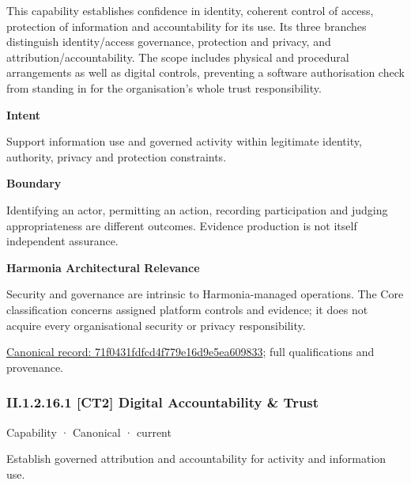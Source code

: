 This capability establishes confidence in identity, coherent control of access, protection of information and accountability for its use. Its three branches distinguish identity/access governance, protection and privacy, and attribution/accountability. The scope includes physical and procedural arrangements as well as digital controls, preventing a software authorisation check from standing in for the organisation's whole trust responsibility.



\textbf{Intent}



Support information use and governed activity within legitimate identity, authority, privacy and protection constraints.



\textbf{Boundary}



Identifying an actor, permitting an action, recording participation and judging appropriateness are different outcomes. Evidence production is not itself independent assurance.



\textbf{Harmonia Architectural Relevance}



Security and governance are intrinsic to Harmonia-managed operations. The Core classification concerns assigned platform controls and evidence; it does not acquire every organisational security or privacy responsibility.


{\footnotesize \href{../../../../continuum/strategy/capability/71f0431fdfcd4f779e16d9e5ea609833.md}{Canonical record: 71f0431fdfcd4f779e16d9e5ea609833}; full qualifications and provenance.}\par
\subsubsection*{II.1.2.16.1 [CT2] Digital Accountability \& Trust}
\label{navigation:II.1.2.16.1}

\label{element:9a600233ae1f4f3289c09a0b08ce029d}
{\small Capability · Canonical · current}\par

Establish governed attribution and accountability for activity and information use.



